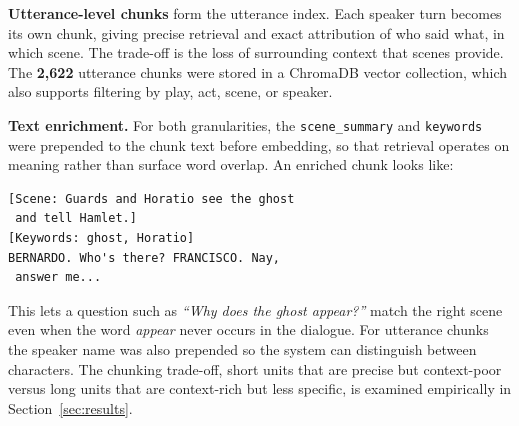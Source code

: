 \textbf{Utterance-level chunks} form the utterance index. Each speaker
turn becomes its own chunk, giving precise retrieval and exact
attribution of who said what, in which scene. The trade-off is the loss
of surrounding context that scenes provide. The \textbf{2{,}622}
utterance chunks were stored in a ChromaDB vector collection, which also
supports filtering by play, act, scene, or speaker.

\textbf{Text enrichment.} For both granularities, the
\texttt{scene\_summary} and \texttt{keywords} were prepended to the chunk
text before embedding, so that retrieval operates on meaning rather than
surface word overlap. An enriched chunk looks like:

\begin{lstlisting}
[Scene: Guards and Horatio see the ghost
 and tell Hamlet.]
[Keywords: ghost, Horatio]
BERNARDO. Who's there? FRANCISCO. Nay,
 answer me...
\end{lstlisting}

This lets a question such as \emph{``Why does the ghost appear?''} match
the right scene even when the word \emph{appear} never occurs in the
dialogue. For utterance chunks the speaker name was also prepended so the
system can distinguish between characters. The chunking trade-off, short
units that are precise but context-poor versus long units that are
context-rich but less specific, is examined empirically in
Section~\ref{sec:results}.
